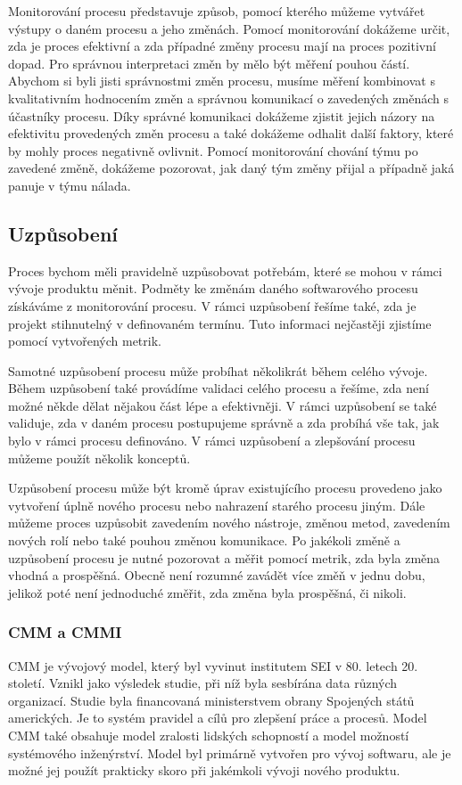 \documentclass[czech,master,public,dept460,male,cpdeclaration,oneside]{diploma}
\begin{document}
Monitorování procesu představuje způsob, pomocí kterého můžeme vytvářet výstupy o daném procesu a jeho změnách. Pomocí monitorování dokážeme určit, zda je proces efektivní a zda případné změny procesu mají na proces pozitivní dopad. Pro správnou interpretaci změn by mělo být měření pouhou částí. Abychom si byli jisti správnostmi změn procesu, musíme měření kombinovat s kvalitativním hodnocením změn a správnou komunikací o zavedených změnách s účastníky procesu. Díky správné komunikaci dokážeme zjistit jejich názory na efektivitu provedených změn procesu a také dokážeme odhalit další faktory, které by mohly proces negativně ovlivnit. Pomocí monitorování chování týmu po zavedené změně, dokážeme pozorovat, jak daný tým změny přijal a případně jaká panuje v týmu nálada.

\subsection{Uzpůsobení}
\label{sec:control}
Proces bychom měli pravidelně uzpůsobovat potřebám, které se mohou v rámci vývoje produktu měnit. Podměty ke změnám daného softwarového procesu získáváme z monitorování procesu. V rámci uzpůsobení řešíme také, zda je projekt stihnutelný v definovaném termínu. Tuto informaci nejčastěji zjistíme pomocí vytvořených metrik.

Samotné uzpůsobení procesu může probíhat několikrát během celého vývoje. Během uzpůsobení také provádíme validaci celého procesu a řešíme, zda není možné někde dělat nějakou část lépe a efektivněji. V rámci uzpůsobení se také validuje, zda v daném procesu postupujeme správně a zda probíhá vše tak, jak bylo v rámci procesu definováno. V rámci uzpůsobení a zlepšování procesu můžeme použít několik konceptů.

Uzpůsobení procesu může být kromě úprav existujícího procesu provedeno jako vytvoření úplně nového procesu nebo nahrazení starého procesu jiným. Dále můžeme proces uzpůsobit zavedením nového nástroje, změnou metod, zavedením nových rolí nebo také pouhou změnou komunikace. Po jakékoli změně a uzpůsobení procesu je nutné pozorovat a měřit pomocí metrik, zda byla změna vhodná a prospěšná. Obecně není rozumné zavádět více změň v jednu dobu, jelikož poté není jednoduché změřit, zda změna byla prospěšná, či nikoli.

\subsubsection{CMM a CMMI}
CMM je vývojový model, který byl vyvinut institutem SEI v 80. letech 20. století. Vznikl jako výsledek studie, při níž byla sesbírána data různých organizací. Studie byla financovaná ministerstvem obrany Spojených států amerických. Je to systém pravidel a cílů pro zlepšení práce a procesů. Model CMM také obsahuje model zralosti lidských schopností a model možností systémového inženýrství. Model byl primárně vytvořen pro vývoj softwaru, ale je možné jej použít prakticky skoro při jakémkoli vývoji nového produktu. \cite{ref:cmm_cmmi}
\end{document}
